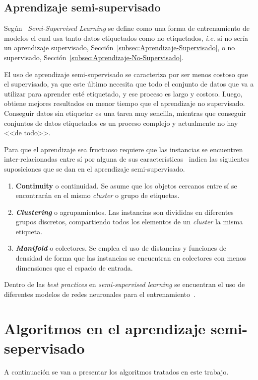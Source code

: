 \subsection{Aprendizaje semi-supervisado}\label{subsec:Aprendizaje-Semi-Supervisado}
Según~\cite{zhou2014semi} \textit{Semi-Supervised Learning} se define como una forma de entrenamiento de modelos el cual usa tanto datos etiquetados como no etiquetados, \textit{i.e.} si no sería un aprendizaje supervisado, Sección~\ref{subsec:Aprendizaje-Supervisado}, o no supervisado, Sección~\ref{subsec:Aprendizaje-No-Supervisado}. 

El uso de aprendizaje semi-supervisado se caracteriza por ser menos costoso que el supervisado, ya que este último necesita que todo el conjunto de datos que va a utilizar para aprender esté etiquetado, y ese proceso es largo y costoso. Luego, obtiene mejores resultados en menor tiempo que el aprendizaje no supervisado. 
Conseguir datos sin etiquetar es una tarea muy sencilla, mientras que conseguir conjuntos de datos etiquetados es un proceso complejo y actualmente no hay <<de todo>>.

Para que el aprendizaje sea fructuoso requiere que las instancias se encuentren inter-relacionadas entre sí por alguna de sus características~\cite{javatpoint_semisupervised} indica las siguientes suposiciones que se dan en el aprendizaje semi-supervisado.
\begin{enumerate}
	\item \textbf{Continuity} o continuidad. Se asume que los objetos cercanos entre sí se encontrarán en el mismo \textit{cluster} o grupo de etiquetas. 
	\item \textbf{\textit{Clustering}} o agrupamientos. Las instancias son divididas en diferentes grupos discretos, compartiendo todos los elementos de un \textit{cluster} la misma etiqueta.
	\item \textbf{\textit{Manifold}} o colectores. Se emplea el uso de distancias y funciones de densidad de forma que las instancias se encuentran en colectores con menos dimensiones que el espacio de entrada.
\end{enumerate}

Dentro de las \textit{best practices} en \textit{semi-supervised learning} se encuentran el uso de diferentes modelos de redes neuronales para el entrenamiento~\cite{thekumparampil2018attention}.


\section{Algoritmos en el aprendizaje semi-sepervisado}\label{sec_alg:semi-supervised}
A continuación se van a presentar los algoritmos tratados en este trabajo.

